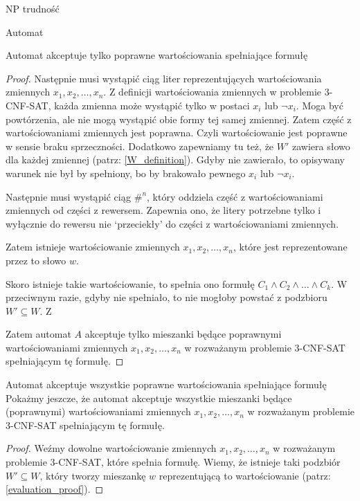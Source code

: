 \documentclass{article}
\theoremstyle{definition}
\theoremstyle{remark}
\begin{document}
\begin{section}{NP trudność}
\begin{subsection}{Automat}
\begin{subsection}{Automat akceptuje tylko poprawne wartościowania spełniające formułę}
\begin{proof}
             Następnie musi wystąpić ciąg liter reprezentujących wartościowania zmiennych
             $x_1, x_2, \ldots, x_n$. Z definicji wartościowania zmiennych w problemie
             3-CNF-SAT, każda zmienna może wystąpić tylko w postaci $x_i$ lub $\neg x_i$.
             Moga być powtórzenia, ale nie mogą wystąpić obie formy tej samej zmiennej.
             Zatem część z wartościowaniami zmiennych jest poprawna. Czyli wartościowanie
             jest poprawne w sensie braku sprzeczności. Dodatkowo zapewniamy tu też, że $W'$
             zawiera słowo dla każdej zmiennej (patrz: \ref{W_definition}). Gdyby nie
             zawierało, to opisywany warunek nie był by spełniony, bo by brakowało pewnego
             $x_i$ lub $\neg x_i$.

             Następnie musi wystąpić ciąg $ \#^n $, który oddziela część z wartościowaniami
             zmiennych od części z rewersem. Zapewnia ono, że litery potrzebne tylko i
             wyłącznie do rewersu nie `przeciekły' do części z wartościowaniami zmiennych.

             Zatem istnieje wartościowanie zmiennych $x_1, x_2, \ldots, x_n$, które jest
             reprezentowane przez to słowo $w$.

             Skoro istnieje takie wartościowanie, to spełnia ono formułę $C_1 \land C_2
                 \land \ldots \land C_k$. W przeciwnym razie, gdyby nie spełniało, to nie
             mogłoby powstać z podzbioru $W' \subseteq W$. Z

             Zatem automat $A$ akceptuje tylko mieszanki będące poprawnymi wartościowaniami
             zmiennych $x_1, x_2, \ldots, x_n$ w rozważanym problemie 3-CNF-SAT spełniającym
             tę formułę.
         \end{proof}

     \end{subsection}

     \begin{subsection}{Automat akceptuje wszystkie poprawne wartościowania spełniające formułę}
         Pokażmy jeszcze, że automat akceptuje wszystkie mieszanki będące (poprawnymi)
         wartościowaniami zmiennych $x_1, x_2, \ldots, x_n$ w rozważanym problemie
         3-CNF-SAT spełniającym tę formułę.

         \begin{proof}
             Weźmy dowolne wartościowanie zmiennych $x_1, x_2, \ldots, x_n$ w rozważanym problemie 3-CNF-SAT, które spełnia formułę.
             Wiemy, że istnieje taki podzbiór $W' \subseteq W$, który tworzy mieszankę $w$ reprezentującą to wartościowanie (patrz: \ref{evaluation_proof}).


\end{proof}
\end{subsection}
\end{subsection}
\end{section}
\end{document}
